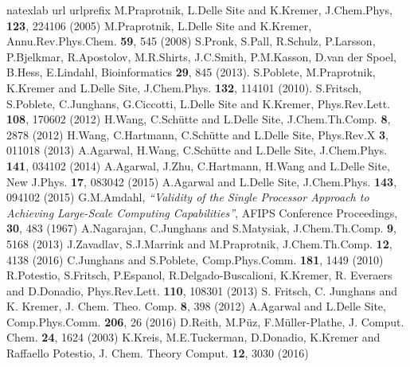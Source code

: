 \documentclass[a4paper,preprint,unsortedaddress]{revtex4-1}
\begin{document}
\begin{thebibliography}{24}
\expandafter\ifx\csname natexlab\endcsname\relax\def\natexlab#1{#1}\fi
\expandafter\ifx\csname url\endcsname\relax
  \def\url#1{\texttt{#1}}\fi
\expandafter\ifx\csname urlprefix\endcsname\relax\def\urlprefix{URL }\fi
{}
M.Praprotnik, L.Delle Site and K.Kremer, J.Chem.Phys, {\bf 123}, 224106 (2005)
M.Praprotnik, L.Delle Site and K.Kremer, Annu.Rev.Phys.Chem. {\bf 59}, 545 (2008)
S.Pronk, S.Pall, R.Schulz, P.Larsson, P.Bjelkmar, R.Apostolov, M.R.Shirts, J.C.Smith, P.M.Kasson, D.van der Spoel, B.Hess, E.Lindahl, Bioinformatics {\bf 29}, 845 (2013).
S.Poblete, M.Praprotnik, K.Kremer and L.Delle Site, J.Chem.Phys. {\bf 132}, 114101 (2010).
S.Fritsch, S.Poblete, C.Junghans, G.Ciccotti, L.Delle Site and K.Kremer, Phys.Rev.Lett. {\bf 108}, 170602 (2012)
H.Wang, C.Sch\"{u}tte and L.Delle Site, J.Chem.Th.Comp. {\bf 8}, 2878 (2012)
H.Wang, C.Hartmann, C.Sch\"{u}tte and L.Delle Site, Phys.Rev.X {\bf 3}, 011018 (2013)
A.Agarwal, H.Wang, C.Sch\"{u}tte and L.Delle Site, J.Chem.Phys. {\bf 141}, 034102 (2014)
A.Agarwal, J.Zhu, C.Hartmann, H.Wang and L.Delle Site, New J.Phys. {\bf 17}, 083042 (2015)
A.Agarwal and L.Delle Site, J.Chem.Phys. {\bf 143}, 094102 (2015)
G.M.Amdahl, {\it ``Validity of the Single Processor Approach to Achieving Large-Scale Computing Capabilities''}, AFIPS Conference Proceedings, {\bf 30}, 483 (1967)
{
A.Nagarajan, C.Junghans and S.Matysiak, J.Chem.Th.Comp. {\bf 9}, 5168 (2013)
J.Zavadlav, S.J.Marrink and M.Praprotnik, J.Chem.Th.Comp. {\bf 12}, 4138 (2016)} 
C.Junghans and S.Poblete, Comp.Phys.Comm. {\bf 181}, 1449 (2010)
R.Potestio, S.Fritsch, P.Espanol, R.Delgado-Buscalioni, K.Kremer, R. Everaers and D.Donadio, Phys.Rev.Lett. {\bf 110}, 108301 (2013)
S. Fritsch, C. Junghans and K. Kremer, J. Chem. Theo. Comp. {\bf 8}, 398 (2012)
A.Agarwal and L.Delle Site, Comp.Phys.Comm. {\bf 206}, 26 (2016) 
D.Reith, M.P\"uz, F.M\"uller-Plathe, J. Comput. Chem. {\bf 24}, 1624 (2003)
K.Kreis, M.E.Tuckerman, D.Donadio, K.Kremer and Raffaello Potestio, J. Chem. Theory Comput. {\bf 12}, 3030 (2016)
\end{thebibliography}
\end{document}
